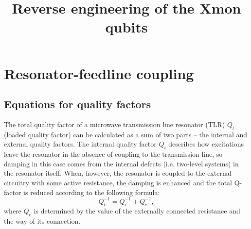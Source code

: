 \documentclass[12pt]{report}
\title{Reverse engineering of the Xmon qubits}
\numberwithin{equation}{section}
\begin{document}
\maketitle
\tableofcontents

\chapter{Resonator-feedline coupling}

\section{Equations for quality factors}

The total quality factor of a microwave transmission line resonator (TLR) $Q_l$ (loaded quality factor) can be calculated as a sum of two parts -- the internal and external quality factors. The internal quality factor $Q_i$ describes how excitations leave the resonator in the absence of coupling to the transmission line, so damping in this case comes from the internal defects (i.e. two-level systems) in the resonator itself. When, however, the resonator is coupled to the external circuitry with some active resistance, the damping is enhanced and the total Q-factor is reduced according to the following formula:
\begin{equation}
Q_l^{-1} = Q_i^{-1}+Q_e^{-1},
\label{eq:qfactor}
\end{equation}
where $Q_e$ is determined by the value of the externally connected resistance and the way of its connection.
\end{document}
